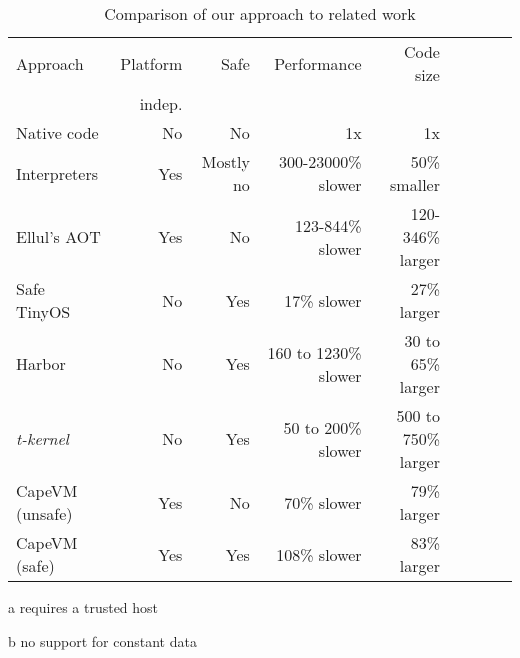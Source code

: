 \begin{table}
\caption{Comparison of our approach to related work}
\label{tbl-contribution-comparison}
    \begin{threeparttable}
    \begin{tabular}{lrrrrrrrr} %
    \toprule
    Approach        & Platform    & Safe               & Performance           & Code size                  \\
                    & indep.      &                    &                       &                            \\
    \midrule
    \midrule
    Native code     & No          & No                 & 1x                    & 1x                         \\
    Interpreters    & Yes         & Mostly no          & 300-23000\% slower    & ~50\% smaller \tnote{b}    \\
    Ellul's AOT     & Yes         & No                 & 123-844\% slower      & 120-346\% larger \tnote{b} \\
    Safe TinyOS     & No          & Yes \tnote{a}      & 17\% slower           & 27\% larger                \\
    Harbor          & No          & Yes                & 160 to 1230\% slower  & 30 to 65\% larger          \\
    \emph{t-kernel} & No          & Yes                & 50 to 200\% slower    & 500 to 750\% larger        \\
    CapeVM (unsafe) & Yes         & No                 & 70\% slower           & 79\% larger                \\ %
    CapeVM (safe)   & Yes         & Yes                & 108\% slower          & 83\% larger                \\ %
    \bottomrule
    \end{tabular}
    \begin{tablenotes}
        \item[a] requires a trusted host
        \item[b] no support for constant data
    \end{tablenotes}
    \end{threeparttable}
\end{table}
